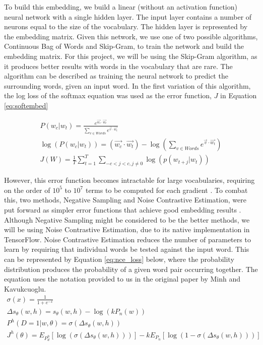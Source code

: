 \documentclass[pageno]{jpaper}
\begin{document}
\par
To build this embedding, we build a linear (without an activation function) neural network with a single hidden layer.  The input layer contains a number of neurons equal to the size of the vocabulary.  The hidden layer is represented by the embedding matrix.  Given this network, we use one of two possible algorithms, Continuous Bag of Words and Skip-Gram, to train the network and build the embedding matrix.  For this project, we will be using the Skip-Gram algorithm, as it produces better results with words in the vocabulary that are rare.  The algorithm can be described as training the neural network to predict the surrounding words, given an input word.  In the first variation of this algorithm, the log loss of the softmax equation was used as the error function, $J$ in Equation \ref{eq:softembed}

\begin{subequations}
\label{eq:softembed}
\begin{gather}
P(w_{c} \vert w_{t}) = \frac{e^{\vec{w_{c}} \cdot \vec{w_{t}}}}{\sum_{v \in Words} e^{\vec{v} \cdot \vec{w_{t}}}}\\
\log(P(w_{c} \vert w_{t})) = \left(\vec{w_{c}} \cdot \vec{w_{t}}\right) - \log\left( \sum_{v \in Words} e^{\vec{v} \cdot \vec{w_{t}}} \right) \\
J(W) = \frac{1}{T} \sum_{t = 1}^{T} \sum_{-c < j < c, j \neq 0} \log(p(w_{t + j} \vert w_{t}))
\end{gather}
\end{subequations}

However, this error function becomes intractable for large vocabularies, requiring on the order of $10^{5}$ to $10^{7}$ terms to be computed for each gradient \cite{mikolov:2013:2}.  To combat this, two methods, Negative Sampling and Noise Contrastive Estimation, were put forward as simpler error functions that achieve good embedding results \cite{mnih:2013}.  Although Negative Sampling might be considered to be the better methods, we will be using Noise Contrastive Estimation, due to its native implementation in TensorFlow.  Noise Contrastive Estimation reduces the number of parameters to learn by requiring that individual words be tested against the input word.  This can be represented by Equation \ref{eq:nce_loss} below, where the probability distribution produces the probability of a given word pair occurring together.  The equation uses the notation provided to us in the original paper by Minh and Kavukcuoglu.
\begin{subequations}
	\label{eq:nce_loss}
	\begin{gather}
	\sigma(x) = \frac{1}{1 + e^{-x}} \\
	\Delta s_{\theta}(w, h) = s_{\theta}(w, h) - \log(k P_{n}(w))\\
	P^{h}(D = 1 \vert w, \theta) = \sigma\left(\Delta s_{\theta}(w,h)\right)\\
	J^{h}(\theta) = E_{P^{h}_{d}}\left[\log \left(\sigma\left(\Delta s_{\theta}(w,h)\right)\right)\right] - kE_{P_{n}}\left[\log \left(1 - \sigma\left(\Delta s_{\theta}(w,h)\right)\right)\right]
	\end{gather}
\end{subequations}
\end{document}
